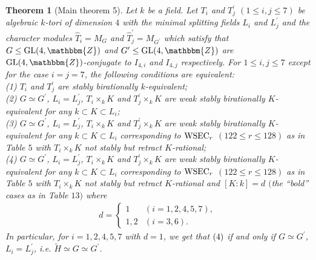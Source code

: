 \documentclass{amsart}
\theoremstyle{plain}
\newtheorem{theorem}{Theorem}[section]
\theoremstyle{definition}
\theoremstyle{remark}
\newcommand{\bZ}{\mathbbm{Z}}\newcommand{\bQ}{\mathbbm{Q}}
\newcommand{\GL}{{\rm GL}}\newcommand{\SL}{{\rm SL}}
\newcounter{sub}\def\tr{\mbox{tr }}
\begin{document}
\begin{theorem}[Main theorem 5]\label{thmain5}
Let $k$ be a field. 
Let $T_i$ and $T_j^\prime$ $(1\leq i,j\leq 7)$ 
be algebraic $k$-tori of dimension $4$ 
with the minimal splitting fields $L_i$ and $L^\prime_j$ 
and the character modules 
$\widehat{T}_i=M_G$ and $\widehat{T}^\prime_j=M_{G^\prime}$ 
which satisfy that 
$G\leq \GL(4,\bZ)$ and $G^\prime\leq \GL(4,\bZ)$ are 
$\GL(4,\bZ)$-conjugate to $I_{4,i}$ and $I_{4,j}$ respectively. 
For $1\leq i,j\leq 7$ except for the case $i=j=7$, 
the following conditions are equivalent:\\
{\rm (1)} $T_i$ and $T_j^\prime$ are stably birationally $k$-equivalent;\\
{\rm (2)} 
$G\simeq G^\prime$, 
$L_i=L_j^\prime$, 
$T_i\times_k K$ and $T_j^\prime\times_k K$ 
are weak stably birationally $K$-equivalent 
for any $k\subset K\subset L_i$;\\
{\rm (3)} 
$G\simeq G^\prime$, 
$L_i=L_j^\prime$, 
$T_i\times_k K$ and $T_j^\prime\times_k K$ 
are weak stably birationally $K$-equivalent 
for any $k\subset K\subset L_i$ corresponding to 
${\rm WSEC}_r$ $(122\leq r\leq 128)$ as in Table $5$ 
with $T_i\times_k K$ not stably but retract $K$-rational;\\
{\rm (4)} 
$G\simeq G^\prime$, 
$L_i=L_j^\prime$, 
$T_i\times_k K$ and $T_j^\prime\times_k K$ 
are weak stably birationally $K$-equivalent 
for any $k\subset K\subset L_i$ corresponding to 
${\rm WSEC}_r$ $(122\leq r\leq 128)$ as in Table $5$ 
with $T_i\times_k K$ not stably but retract $K$-rational 
and $[K:k]=d$ 
$($the ``bold'' cases as in {\rm Table} $13$$)$
where 
\begin{align*}
d=
\begin{cases}
1&(i=1,2,4,5,7),\\
1,2&(i=3,6).
\end{cases}
\end{align*}
In particular, for $i=1,2,4,5,7$ with $d=1$, we get that 
${(\rm 4)}$ 
if and only if $G\simeq G^\prime$, $L_i=L_j^\prime$, 
i.e. $\widetilde{H}\simeq G\simeq G^\prime$. 


\end{theorem}
\end{document}
